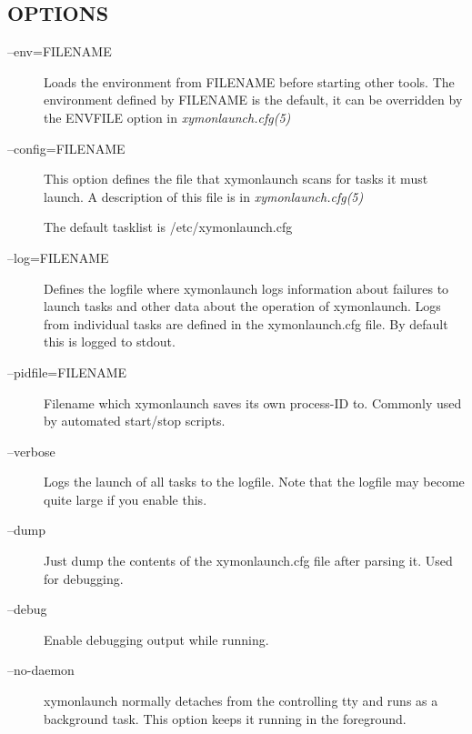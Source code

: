 \subsection{OPTIONS}
\begin{description}
\item[--env=FILENAME] Loads the environment from FILENAME before
  starting other tools. The environment defined by FILENAME is the
  default, it can be overridden by the ENVFILE option in
  \emph{xymonlaunch.cfg(5)}



 

\item[--config=FILENAME] This option defines the file that
  xymonlaunch scans for tasks it must launch. A description of this
  file is in \emph{xymonlaunch.cfg(5)}

 The default tasklist is /etc/xymonlaunch.cfg 

 

\item[--log=FILENAME] Defines the logfile where xymonlaunch logs
  information about failures to launch tasks and other data about the
  operation of xymonlaunch. Logs from individual tasks are defined in
  the xymonlaunch.cfg file. By default this is logged to stdout. 


 

\item[--pidfile=FILENAME] Filename which xymonlaunch saves its own process-ID to. Commonly used by automated start/stop scripts. 

 

\item[--verbose] Logs the launch of all tasks to the logfile. Note that the logfile may become quite large if you enable this. 

 

\item[--dump] Just dump the contents of the xymonlaunch.cfg file after parsing it. Used for debugging. 

 

\item[--debug] Enable debugging output while running. 

 

\item[--no-daemon] xymonlaunch normally detaches from the controlling
  tty and runs as a background task. This option keeps it running in
  the foreground. 


 

\end{description}

